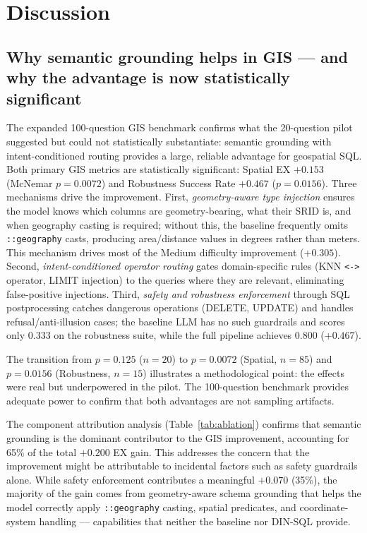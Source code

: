 \documentclass[11pt]{article}
\begin{document}
\section{Discussion}
\label{sec:discussion}

\subsection{Why semantic grounding helps in GIS --- and why the advantage is now statistically significant}

The expanded 100-question GIS benchmark confirms what the 20-question pilot suggested but could not statistically substantiate: semantic grounding with intent-conditioned routing provides a large, reliable advantage for geospatial SQL. Both primary GIS metrics are statistically significant: Spatial EX $+0.153$ (McNemar $p=0.0072$) and Robustness Success Rate $+0.467$ ($p=0.0156$). Three mechanisms drive the improvement. First, \emph{geometry-aware type injection} ensures the model knows which columns are geometry-bearing, what their SRID is, and when geography casting is required; without this, the baseline frequently omits \texttt{::geography} casts, producing area/distance values in degrees rather than meters. This mechanism drives most of the Medium difficulty improvement ($+0.305$). Second, \emph{intent-conditioned operator routing} gates domain-specific rules (KNN \texttt{<-}\texttt{>} operator, LIMIT injection) to the queries where they are relevant, eliminating false-positive injections. Third, \emph{safety and robustness enforcement} through SQL postprocessing catches dangerous operations (DELETE, UPDATE) and handles refusal/anti-illusion cases; the baseline LLM has no such guardrails and scores only $0.333$ on the robustness suite, while the full pipeline achieves $0.800$ ($+0.467$).

The transition from $p=0.125$ ($n=20$) to $p=0.0072$ (Spatial, $n=85$) and $p=0.0156$ (Robustness, $n=15$) illustrates a methodological point: the effects were real but underpowered in the pilot. The 100-question benchmark provides adequate power to confirm that both advantages are not sampling artifacts.

The component attribution analysis (Table~\ref{tab:ablation}) confirms that semantic grounding is the dominant contributor to the GIS improvement, accounting for 65\% of the total $+0.200$ EX gain. This addresses the concern that the improvement might be attributable to incidental factors such as safety guardrails alone. While safety enforcement contributes a meaningful $+0.070$ (35\%), the majority of the gain comes from geometry-aware schema grounding that helps the model correctly apply \texttt{::geography} casting, spatial predicates, and coordinate-system handling --- capabilities that neither the baseline nor DIN-SQL provide.
\end{document}
